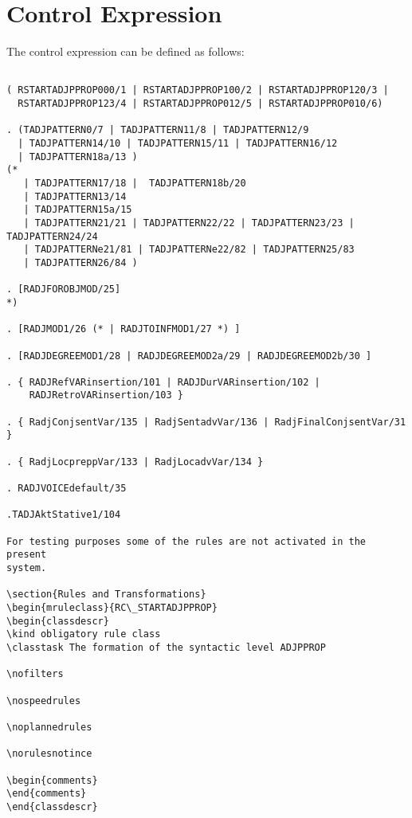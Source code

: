 \section{Control Expression}
The control expression can be defined as follows:
\begin{verbatim}

( RSTARTADJPPROP000/1 | RSTARTADJPPROP100/2 | RSTARTADJPPROP120/3 |
  RSTARTADJPPROP123/4 | RSTARTADJPPROP012/5 | RSTARTADJPPROP010/6)

. (TADJPATTERN0/7 | TADJPATTERN11/8 | TADJPATTERN12/9
  | TADJPATTERN14/10 | TADJPATTERN15/11 | TADJPATTERN16/12
  | TADJPATTERN18a/13 )
(*
   | TADJPATTERN17/18 |  TADJPATTERN18b/20 
   | TADJPATTERN13/14
   | TADJPATTERN15a/15 
   | TADJPATTERN21/21 | TADJPATTERN22/22 | TADJPATTERN23/23 | TADJPATTERN24/24
   | TADJPATTERNe21/81 | TADJPATTERNe22/82 | TADJPATTERN25/83 
   | TADJPATTERN26/84 )

. [RADJFOROBJMOD/25]
*)

. [RADJMOD1/26 (* | RADJTOINFMOD1/27 *) ]

. [RADJDEGREEMOD1/28 | RADJDEGREEMOD2a/29 | RADJDEGREEMOD2b/30 ] 

. { RADJRefVARinsertion/101 | RADJDurVARinsertion/102 |
    RADJRetroVARinsertion/103 }

. { RadjConjsentVar/135 | RadjSentadvVar/136 | RadjFinalConjsentVar/31 }

. { RadjLocpreppVar/133 | RadjLocadvVar/134 }

. RADJVOICEdefault/35 

.TADJAktStative1/104 

For testing purposes some of the rules are not activated in the present 
system. 

\section{Rules and Transformations}
\begin{mruleclass}{RC\_STARTADJPPROP}
\begin{classdescr}
\kind obligatory rule class
\classtask The formation of the syntactic level ADJPPROP

\nofilters

\nospeedrules

\noplannedrules

\norulesnotince

\begin{comments}
\end{comments}
\end{classdescr}


\end{verbatim}
